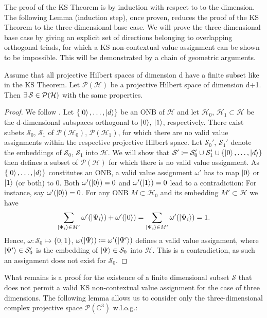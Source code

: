 The proof of the KS Theorem is by induction with respect to to the dimension. The following Lemma (induction step), once proven, reduces the proof of the KS Theorem to the three-dimensional base case. We will prove the three-dimensional base case by giving an explicit set of directions belonging to overlapping orthogonal triads, for which a KS non-contextual value assignment can be shown to be impossible. This will be demonstrated by a chain of geometric arguments.

\begin{lemma}\hfill\break
Assume that all projective Hilbert spaces of dimension d have a finite subset like in the KS Theorem. Let $\mathcal{P}(\mathcal{H})$ be a projective Hilbert space of dimension d+1. Then $\exists\thinspace\mathbb{\mathcal{S}\in\mathcal{P}}(\mathcal{H})$ with the same properties. 
\end{lemma}

\begin{proof}
We follow \cite{Pusey2019}. Let $\{\ket{0},\dots,\ket{d} \}$ be an ONB of $\mathcal{H}$ and let $\mathcal{H}_{0}$, $\mathcal{H}_{1}\subset\mathcal{H}$ be the d-dimensional subspaces orthogonal to $\ket{0}$, $\ket{1}$, respectively. There exist subets $\mathcal{S}_{0}$, $\mathcal{S}_{1}$ of $\mathcal{P}(\mathcal{H}_{0})$, $\mathcal{P}(\mathcal{H}_{1})$, for which there are no valid value assignments within the respective projective Hilbert space. Let $\mathcal{S}_{0}'$, $\mathcal{S}_{1}'$ denote the embeddings of $\mathcal{S}_{0}$, $\mathcal{S}_{1}$ into $\mathcal{H}$. We will show that $\mathcal{S}'\coloneqq\mathcal{S}_{0}'\cup\mathcal{S}_{1}'\cup\{\ket{0},\dots, \ket{d}\}$ then defines a subset of $\mathcal{P}(\mathcal{H})$ for which there is no valid value assignment. As $\{\ket{0},\dots,\ket{d} \}$ constitutes an ONB, a valid value assignment $\omega'$ has to map $\ket{0}$ or $\ket{1}$  (or both) to 0. Both $\omega'(\ket{0})=0$ and $\omega'(\ket{1})=0$ lead to a contradiction: For instance, say $\omega'(\ket{0})=0$. For any ONB $M\subset\mathcal{H}_{0}$ and its embedding $M'\subset\mathcal{H}$ we have
\begin{equation*}
\sum\limits _{\ket{\Psi_{i}}\in M'}\omega'(\left|\Psi_{i}\right\rangle )+\omega'(\ket{0} )=\sum\limits _{\ket{\Psi_{i}}\in M'}\omega'(\ket{\Psi_{i}})=1.     
\end{equation*}
Hence, $\omega:\mathcal{S}_{0}\mapsto\{0,1\}$, $\omega(\ket{\Psi} )\coloneqq\omega'(\ket{\Psi'})$ defines a valid value assignment, where $\ket{\Psi'} \in\mathcal{S}_{0}'$ is the embedding of $\ket{\Psi} \in\mathcal{S}_{0}$ into $\mathcal{H}$. This is a contradiction, as such an assignment does not exist for $\mathcal{S}_{0}$.
\end{proof}
What remains is a proof for the existence of a finite dimensional subset $\mathcal{S}$ that does not permit a valid KS non-contextual value assignment for the case of three dimensions. The following lemma allows us to consider only the three-dimensional complex projective space $\mathcal{P}(\mathbb{C}^{3})$ w.l.o.g.:

